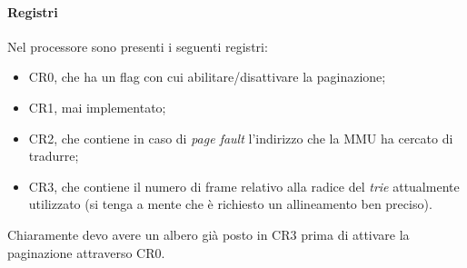\documentclass[11pt]{report}
\theoremstyle{definition}
\begin{document}
\paragraph{Registri} Nel processore sono presenti i seguenti registri:
\begin{itemize}
	\item CR0, che ha un flag con cui abilitare/disattivare la paginazione;
	\item CR1, mai implementato;
	\item CR2, che contiene in caso di \emph{page fault} l'indirizzo che la MMU ha cercato di tradurre;
	\item CR3, che contiene il numero di frame relativo alla radice del \emph{trie} attualmente utilizzato (si tenga a mente che è richiesto un allineamento ben preciso).
\end{itemize}
Chiaramente devo avere un albero già posto in CR3 prima di attivare la paginazione attraverso CR0.
\end{document}
